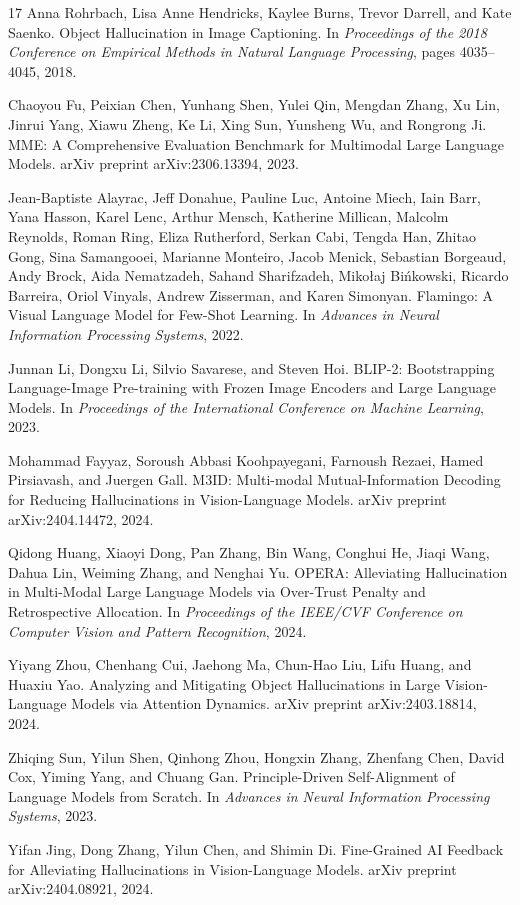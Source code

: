 {\begin{thebibliography}{17}
Anna Rohrbach, Lisa Anne Hendricks, Kaylee Burns, Trevor Darrell, and Kate Saenko.
\newblock Object Hallucination in Image Captioning.
\newblock In \textit{Proceedings of the 2018 Conference on Empirical Methods in Natural Language Processing}, pages 4035--4045, 2018.

Chaoyou Fu, Peixian Chen, Yunhang Shen, Yulei Qin, Mengdan Zhang, Xu Lin, Jinrui Yang, Xiawu Zheng, Ke Li, Xing Sun, Yunsheng Wu, and Rongrong Ji.
\newblock MME: A Comprehensive Evaluation Benchmark for Multimodal Large Language Models.
\newblock arXiv preprint arXiv:2306.13394, 2023.

Jean-Baptiste Alayrac, Jeff Donahue, Pauline Luc, Antoine Miech, Iain Barr, Yana Hasson, Karel Lenc, Arthur Mensch, Katherine Millican, Malcolm Reynolds, Roman Ring, Eliza Rutherford, Serkan Cabi, Tengda Han, Zhitao Gong, Sina Samangooei, Marianne Monteiro, Jacob Menick, Sebastian Borgeaud, Andy Brock, Aida Nematzadeh, Sahand Sharifzadeh, Miko\l{}aj Bi\'nkowski, Ricardo Barreira, Oriol Vinyals, Andrew Zisserman, and Karen Simonyan.
\newblock Flamingo: A Visual Language Model for Few-Shot Learning.
\newblock In \textit{Advances in Neural Information Processing Systems}, 2022.

Junnan Li, Dongxu Li, Silvio Savarese, and Steven Hoi.
\newblock BLIP-2: Bootstrapping Language-Image Pre-training with Frozen Image Encoders and Large Language Models.
\newblock In \textit{Proceedings of the International Conference on Machine Learning}, 2023.

Mohammad Fayyaz, Soroush Abbasi Koohpayegani, Farnoush Rezaei, Hamed Pirsiavash, and Juergen Gall.
\newblock M3ID: Multi-modal Mutual-Information Decoding for Reducing Hallucinations in Vision-Language Models.
\newblock arXiv preprint arXiv:2404.14472, 2024.

Qidong Huang, Xiaoyi Dong, Pan Zhang, Bin Wang, Conghui He, Jiaqi Wang, Dahua Lin, Weiming Zhang, and Nenghai Yu.
\newblock OPERA: Alleviating Hallucination in Multi-Modal Large Language Models via Over-Trust Penalty and Retrospective Allocation.
\newblock In \textit{Proceedings of the IEEE/CVF Conference on Computer Vision and Pattern Recognition}, 2024.

Yiyang Zhou, Chenhang Cui, Jaehong Ma, Chun-Hao Liu, Lifu Huang, and Huaxiu Yao.
\newblock Analyzing and Mitigating Object Hallucinations in Large Vision-Language Models via Attention Dynamics.
\newblock arXiv preprint arXiv:2403.18814, 2024.

Zhiqing Sun, Yilun Shen, Qinhong Zhou, Hongxin Zhang, Zhenfang Chen, David Cox, Yiming Yang, and Chuang Gan.
\newblock Principle-Driven Self-Alignment of Language Models from Scratch.
\newblock In \textit{Advances in Neural Information Processing Systems}, 2023.

Yifan Jing, Dong Zhang, Yilun Chen, and Shimin Di.
\newblock Fine-Grained AI Feedback for Alleviating Hallucinations in Vision-Language Models.
\newblock arXiv preprint arXiv:2404.08921, 2024.

\end{thebibliography}
}